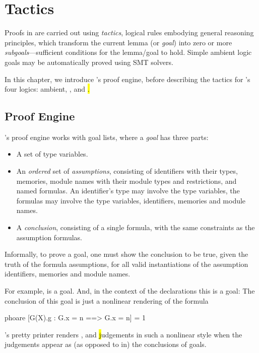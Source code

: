 \chapter{Tactics}
\label{chap:tactics}

Proofs in \EasyCrypt are carried out using \emph{tactics}, logical
rules embodying general reasoning principles, which transform the
current lemma (or \emph{goal}) into zero or more
\emph{subgoals}---sufficient conditions for the lemma/goal to
hold. Simple ambient logic goals may be automatically proved using SMT
solvers.

In this chapter, we introduce \EasyCrypt's proof engine, before
describing the tactics for \EasyCrypt's four logics: ambient, \prhl,
\phl and \hl.

\section{Proof Engine}

\EasyCrypt's proof engine works with goal lists, where a \emph{goal}
has three parts:
\begin{itemize}
\item A set of type variables.

\item An \emph{ordered} set of \emph{assumptions}, consisting of
  identifiers with their types, memories, module names with their
  module types and restrictions, and named formulas. An identifier's
  type may involve the type variables, the formulas may involve the
  type variables, identifiers, memories and module names.

\item A \emph{conclusion}, consisting of a single formula, with
  the same constraints as the assumption formulas.
\end{itemize}
Informally, to prove a goal, one must show the conclusion to be true,
given the truth of the formula assumptions, for all valid instantiations
of the assumption identifiers, memories and module names.

For example,
is a goal.
And, in the context of the declarations
this is a goal:
The conclusion of this goal is just a nonlinear rendering of the formula
\begin{easycrypt}{}{}
phoare [G(X).g : G.x = n ==> G.x = n] = 1%
\end{easycrypt}
\EasyCrypt's pretty printer renders \prhl, \phl and \hl judgements
in such a nonlinear style when the judgements appear as
(as opposed to in) the conclusions of goals.

